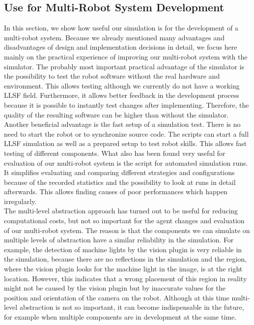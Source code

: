 \subsection{Use for Multi-Robot System Development}
In this section, we show how useful our simulation is for the development of a multi-robot system. Because we already mentioned many advantages and disadvantages of design and implementation decisions in detail, we focus here mainly on the practical experience of improving our multi-robot system with the simulator. 
The probably most important practical advantage of the simulator is the possibility to test the robot software without the real hardware and environment. This allows testing although we currently do not have a working LLSF field. Furthermore, it allows better feedback in the development process because it is possible to instantly test changes after implementing. Therefore, the quality of the resulting software can be higher than without the simulator. Another beneficial advantage is the fast setup of a simulation test. There is no need to start the robot or to synchronize source code. The scripts can start a full LLSF simulation as well as a prepared setup to test robot skills. This allows fast testing of different components.
What also has been found very useful for evaluation of our multi-robot system is the script for automated simulation runs. It simplifies evaluating and comparing different strategies and configurations because of the recorded statistics and the possibility to look at runs in detail afterwards. This allows finding causes of poor performances which happen irregularly.\\
The multi-level abstraction approach has turned out to be useful for reducing computational costs, but not so important for the agent changes and evaluation of our multi-robot system. The reason is that the components we can simulate on multiple levels of abstraction have a similar reliability in the simulation. For example, the detection of machine lights by the vision plugin is very reliable in the simulation, because there are no reflections in the simulation and the region, where the vision plugin looks for the machine light in the image, is at the right location. However, this indicates that a wrong placement of this region in reality might not be caused by the vision plugin but by inaccurate values for the position and orientation of the camera on the robot. Although at this time multi-level abstraction is not so important, it can become indispensable in the future, for example when multiple components are in development at the same time.\\
